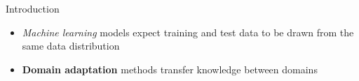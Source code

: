 \documentclass[aspectratio=141]{beamer}
\newcommand\pro{\item[\faThumbsOUp]}
\newcommand\con{\item[\faThumbsODown]}
\begin{document}
\begin{frame}{Introduction}
\begin{overlayarea}{\textwidth}{6cm}
\begin{itemize}
        \con<4-> \textit{Machine learning} models expect \alert{training} and \alert{test} data to be drawn from the same \alert{data distribution}
        \vspace*{3mm}
        \pro<5-> \alert{\textbf{Domain adaptation}} methods transfer knowledge between domains
    \end{itemize}
    \end{overlayarea}
\end{frame}
\end{document}
